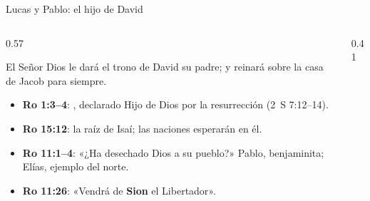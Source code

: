 \begin{frame}{Lucas y Pablo: el hijo de David}
\begin{columns}[T,onlytextwidth]
\begin{column}{0.57\textwidth}
\begin{cita}El Señor Dios le dará el trono de David su padre; y reinará sobre la casa de Jacob para siempre.\end{cita}
\scriptsize
\begin{itemize}
\item \textbf{Ro 1:3--4}: , declarado Hijo de Dios por la resurrección (2~S 7:12--14).
\item \textbf{Ro 15:12}: la raíz de Isaí; las naciones esperarán en él.
\item \textbf{Ro 11:1--4}: «¿Ha desechado Dios a su pueblo?» Pablo, benjaminita; Elías, ejemplo del norte.
\item \textbf{Ro 11:26}: «Vendrá de \textbf{Sion} el Libertador».
\end{itemize}
\end{column}
\begin{column}{0.41\textwidth}\end{column}
\end{columns}
\end{frame}


